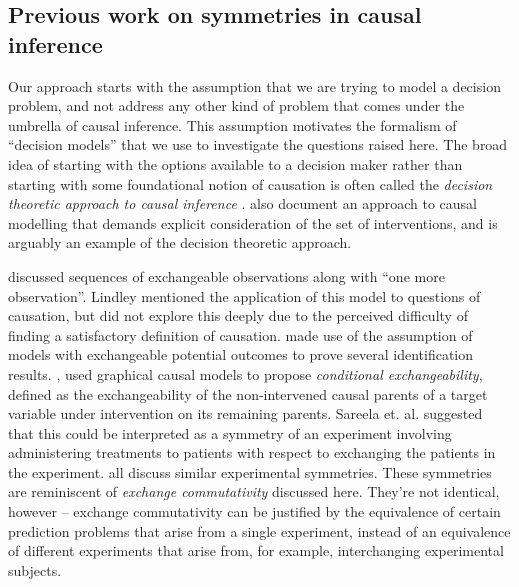 \documentclass{article}
\begin{document}
\subsection{Previous work on symmetries in causal inference}\label{sec:prev_work}

Our approach starts with the assumption that we are trying to model a decision problem, and not address any other kind of problem that comes under the umbrella of causal inference. This assumption motivates the formalism of ``decision models'' that we use to investigate the questions raised here. The broad idea of starting with the options available to a decision maker rather than starting with some foundational notion of causation is often called the \emph{decision theoretic approach to causal inference} \citep{heckerman_decision-theoretic_1995,dawid_decision-theoretic_2012,dawid_decision-theoretic_2020}. \citet{lattimore_causal_2019,lattimore_replacing_2019} also document an approach to causal modelling that demands explicit consideration of the set of interventions, and is arguably an example of the decision theoretic approach.

\citet{lindley_role_1981} discussed sequences of exchangeable observations along with ``one more observation''. Lindley mentioned the application of this model to questions of causation, but did not explore this deeply due to the perceived difficulty of finding a satisfactory definition of causation. \citet{rubin_causal_2005, imbens_causal_2015} made use of the assumption of models with exchangeable potential outcomes to prove several identification results. \citet{saarela_role_2020}, used graphical causal models to propose \emph{conditional exchangeability}, defined as the exchangeability of the non-intervened causal parents of a target variable under intervention on its remaining parents. Sareela et. al. suggested that this could be interpreted as a symmetry of an experiment involving administering treatments to patients with respect to exchanging the patients in the experiment. \citet{hernan_estimating_2006,hernan_beyond_2012,greenland_identifiability_1986,banerjee_chapter_2017,dawid_decision-theoretic_2020} all discuss similar experimental symmetries. These symmetries are reminiscent of \emph{exchange commutativity} discussed here. They're not identical, however -- exchange commutativity can be justified by the equivalence of certain prediction problems that arise from a single experiment, instead of an equivalence of different experiments that arise from, for example, interchanging experimental subjects.
\end{document}
